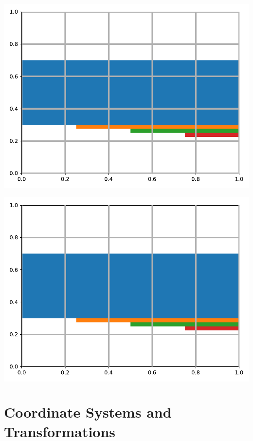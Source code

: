 
\begin{center}
    \includegraphics[width = .8\textwidth]{figures/proseplots/front-axes.pdf}
\end{center}


\begin{center}
    \includegraphics[width = .8\textwidth]{figures/proseplots/front-xaxis.pdf}
\end{center}




\section{Coordinate Systems and Transformations}

